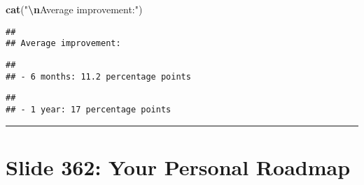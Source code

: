 \documentclass[
]{article}
\newenvironment{Shaded}{\begin{snugshade}}{\end{snugshade}}
\newcommand{\DecValTok}[1]{\textcolor[rgb]{0.00,0.00,0.81}{#1}}
\newcommand{\FunctionTok}[1]{\textcolor[rgb]{0.13,0.29,0.53}{\textbf{#1}}}
\newcommand{\NormalTok}[1]{#1}
\newcommand{\SpecialCharTok}[1]{\textcolor[rgb]{0.81,0.36,0.00}{\textbf{#1}}}
\newcommand{\StringTok}[1]{\textcolor[rgb]{0.31,0.60,0.02}{#1}}
\begin{document}
\begin{Shaded}
\begin{Highlighting}[]
\FunctionTok{cat}\NormalTok{(}\StringTok{"}\SpecialCharTok{\textbackslash{}n}\StringTok{Average improvement:"}\NormalTok{)}
\end{Highlighting}
\end{Shaded}

\begin{verbatim}
## 
## Average improvement:
\end{verbatim}

\begin{Shaded}
\end{Shaded}

\begin{verbatim}
## 
## - 6 months: 11.2 percentage points
\end{verbatim}

\begin{Shaded}
\end{Shaded}

\begin{verbatim}
## 
## - 1 year: 17 percentage points
\end{verbatim}

\begin{center}\rule{0.5\linewidth}{0.5pt}\end{center}

\section{Slide 362: Your Personal
Roadmap}\label{slide-362-your-personal-roadmap}
\end{document}

